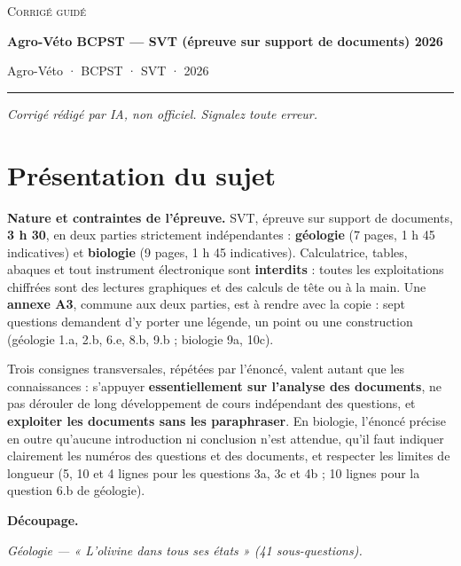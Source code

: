 \documentclass[11pt,a4paper]{article}
\begin{document}
\thispagestyle{plain}
\begin{center}
  {\small\scshape Corrigé guidé}\par\smallskip
  {\LARGE\bfseries Agro-Véto BCPST — SVT (épreuve sur support de documents) 2026\par}\medskip
  {\large Agro-Véto · BCPST · SVT · 2026\par}
\end{center}
\vspace{2pt}\hrule\vspace{8pt}

\emph{Corrigé rédigé par IA, non officiel. Signalez toute erreur.}

\hypertarget{pruxe9sentation-du-sujet}{%
\section{Présentation du sujet}\label{pruxe9sentation-du-sujet}}

\textbf{Nature et contraintes de l'épreuve.} SVT, épreuve sur support de documents, \textbf{3 h 30}, en deux parties strictement indépendantes : \textbf{géologie} (7 pages, 1 h 45 indicatives) et \textbf{biologie} (9 pages, 1 h 45 indicatives). Calculatrice, tables, abaques et tout instrument électronique sont \textbf{interdits} : toutes les exploitations chiffrées sont des lectures graphiques et des calculs de tête ou à la main. Une \textbf{annexe A3}, commune aux deux parties, est à rendre avec la copie : sept questions demandent d'y porter une légende, un point ou une construction (géologie 1.a, 2.b, 6.e, 8.b, 9.b ; biologie 9a, 10c).

Trois consignes transversales, répétées par l'énoncé, valent autant que les connaissances : s'appuyer \textbf{essentiellement sur l'analyse des documents}, ne pas dérouler de long développement de cours indépendant des questions, et \textbf{exploiter les documents sans les paraphraser}. En biologie, l'énoncé précise en outre qu'aucune introduction ni conclusion n'est attendue, qu'il faut indiquer clairement les numéros des questions et des documents, et respecter les limites de longueur (5, 10 et 4 lignes pour les questions 3a, 3c et 4b ; 10 lignes pour la question 6.b de géologie).

\textbf{Découpage.}

\emph{Géologie --- « L'olivine dans tous ses états » (41 sous-questions).}
\end{document}
